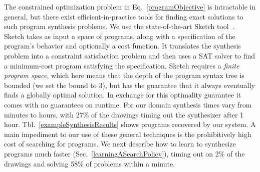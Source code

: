 \documentclass{article}
\theoremstyle{definition}
\begin{document}
The constrained optimization problem in
Eq.~\ref{programObjective} is intractable in general, but there
exist efficient-in-practice tools for finding exact solutions to such
program synthesis problems. We use the state-of-the-art Sketch
tool~\citep{solar2008program}.
Sketch takes as input a space of programs, along with
a specification of the program's behavior and optionally a cost
function.  It translates the synthesis problem into a constraint
satisfaction problem and then uses a SAT solver to find a minimum-cost
program satisfying the specification.  Sketch requires a
 \emph{finite program space}, which here means that the depth of the
program syntax tree is bounded (we set the bound to 3),
but has the guarantee that it 
always eventually finds a globally optimal solution.
In exchange for this optimality guarantee
it comes with no guarantees
on runtime.
For our domain synthesis times vary from minutes to hours,
with 27\% of the drawings timing out the synthesizer after 1 hour.
Tbl.~\ref{exampleSynthesisResults} shows programs recovered by our system.
A main impediment to our use of these general techniques is
the prohibitively high cost of searching for programs.
We next describe how to learn to synthesize programs much faster (Sec.~\ref{learningASearchPolicy}),
timing out on 2\% of the drawings and solving 58\% of problems within a minute.

\newcommand{\exampleProgramSize}{4cm}
\newcommand{\exampleTraceSize}{3.5cm}
\newcommand{\exampleDrawingSize}{1.25cm}
\lstset{basicstyle = \scriptsize\ttfamily}
\end{document}
